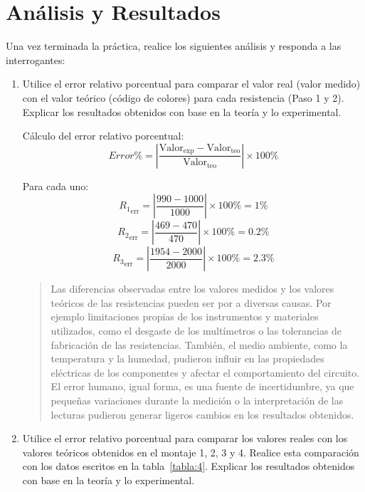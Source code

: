 \documentclass{article}
\begin{document}
    \section{Análisis y Resultados}

    Una vez terminada la práctica, realice los siguientes análisis y responda a las interrogantes:

    \begin{enumerate}[label=\alph*.-]
        \item Utilice el error relativo porcentual para comparar el valor real (valor medido) con el valor teórico (código de colores) para cada resistencia (Paso 1 y 2). Explicar los resultados obtenidos con base en la teoría y lo experimental.
        
        Cálculo del error relativo porcentual:
        \[
            Error\% = \left|\frac{\text{Valor}_{\text{exp}} - \text{Valor}_{\text{teo}}}{\text{Valor}_{\text{teo}}}\right| \times 100\%
        \]

        Para cada uno:
        \[
            {R_1}_{\text{err}} = \left|\frac{990 - 1000}{1000}\right| \times 100\% = 1\%
        \]
        \[
            {R_2}_{\text{err}} = \left|\frac{469 - 470}{470}\right| \times 100\% = 0.2\%
        \]
        \[
            {R_3}_{\text{err}} = \left|\frac{1954 - 2000}{2000}\right| \times 100\% = 2.3\%
        \]

        \begin{quote}
            Las diferencias observadas entre los valores medidos y los valores teóricos de las resistencias pueden ser por a diversas causas. Por ejemplo limitaciones propias de los instrumentos y materiales utilizados, como el desgaste de los multímetros o las tolerancias de fabricación de las resistencias. También, el medio ambiente, como la temperatura y la humedad, pudieron influir en las propiedades eléctricas de los componentes y afectar el comportamiento del circuito. El error humano, igual forma, es una fuente de incertidumbre, ya que pequeñas variaciones durante la medición o la interpretación de las lecturas pudieron generar ligeros cambios en los resultados obtenidos.
        \end{quote}

        \item Utilice el error relativo porcentual para comparar los valores reales con los valores teóricos obtenidos en el montaje 1, 2, 3 y 4. Realice esta comparación con los datos escritos en la tabla~\ref{tabla:4}. Explicar los resultados obtenidos con base en la teoría y lo experimental.
        

\end{enumerate}
\end{document}
